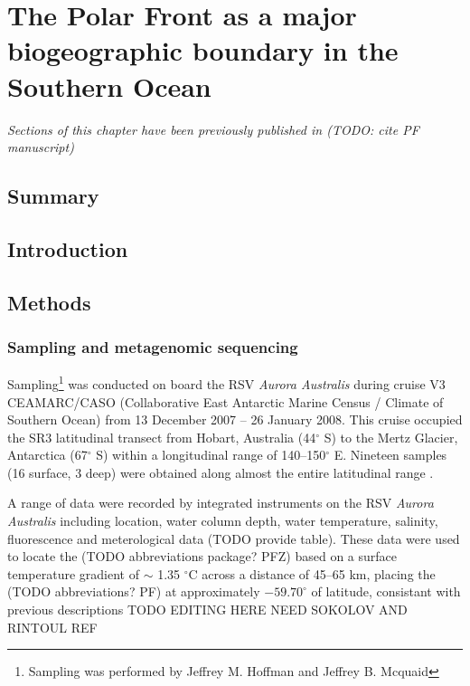 \chapter{The Polar Front as a major biogeographic boundary in the Southern Ocean} 
\label{ch:polarfront}

\emph{Sections of this chapter have been previously published in (TODO: cite PF manuscript)}

\section{Summary}

\section{Introduction}


\section{Methods}
\subsection{Sampling and metagenomic sequencing}

Sampling\footnote{Sampling was performed by Jeffrey M. Hoffman and Jeffrey B. Mcquaid} was conducted on board the RSV \emph{Aurora Australis} during cruise V3 CEAMARC/CASO (Collaborative East Antarctic Marine Census / Climate of Southern Ocean) from 13 December 2007 -- 26 January 2008. 
This cruise occupied the SR3 latitudinal transect from Hobart, Australia (44$^\circ$ S) to the Mertz Glacier, Antarctica (67$^\circ$ S) within a longitudinal range of 140--150$^\circ$ E.
Nineteen samples (16 surface, 3 deep) were obtained along almost the entire latitudinal range .



A range of data were recorded by integrated instruments on the RSV \emph{Aurora Australis} including location, water column depth, water temperature, salinity, fluorescence and meterological data (TODO provide table).
These data were used to locate the (TODO abbreviations package? PFZ) based on a surface temperature gradient of $\sim$ 1.35 $^\circ$C across a distance of 45--65 km, placing the (TODO abbreviations? PF) at approximately $-59.70^\circ$ of latitude, consistant with previous descriptions TODO EDITING HERE NEED SOKOLOV AND RINTOUL REF

